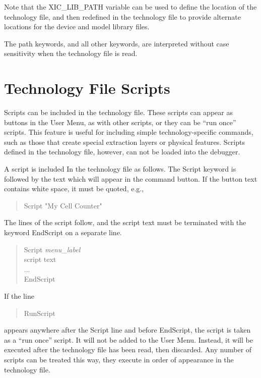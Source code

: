 Note that the {\vt XIC\_LIB\_PATH} variable can be used to define the
location of the technology file, and then redefined in the technology
file to provide alternate locations for the device and model library
files.

The path keywords, and all other keywords, are interpreted without
case sensitivity when the technology file is read.


\section{Technology File Scripts}

Scripts can be included in the technology file.  These scripts can
appear as buttons in the {\cb User Menu}, as with other scripts, or
they can be ``run once'' scripts.  This feature is useful for
including simple technology-specific commands, such as those that
create special extraction layers or physical features.  Scripts
defined in the technology file, however, can not be loaded into the
debugger.

A script is included In the technology file as follows.  The {\vt
Script} keyword is followed by the text which will appear in the
command button.  If the button text contains white space, it must be
quoted, e.g.,

\begin{quote} \vt
Script "My Cell Counter"
\end{quote}

The lines of the script follow, and the script text must be
terminated with the keyword {\vt EndScript} on a separate line.

\begin{quote}
  {\vt Script} {\it menu\_label}\\
  script text\\
  ...\\
  {\vt EndScript}
\end{quote}

If the line
\begin{quote} \vt
RunScript
\end{quote}
appears anywhere after the {\vt Script} line and before {\vt
EndScript}, the script is taken as a ``run once'' script.  It will not
be added to the {\cb User Menu}.  Instead, it will be executed after
the technology file has been read, then discarded.  Any number of
scripts can be treated this way, they execute in order of appearance
in the technology file.

